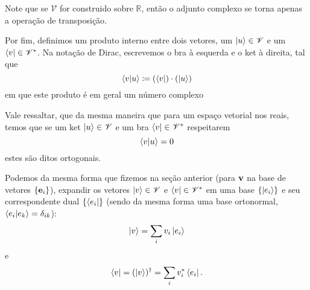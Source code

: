 Note que se $\mathscr{V}$ for construido sobre $\mathbb{R}$, então o adjunto complexo se torna apenas a operação de transposição. 

Por fim, definimos um produto interno entre dois vetores, um $\ket{u}\in\mathscr{V}$ e um  $\bra{v}\in\mathscr{V}^{\ast}$. Na notação de Dirac, escrevemos o bra à esquerda e o ket à direita, tal que
    \begin{equation}
    \label{inner product in Dirac notation}
        \braket{v}{u} \coloneqq (\bra{v})\cdot(\ket{u})
    \end{equation}
em que este produto é em geral um número complexo

Vale ressaltar, que da mesma maneira que para um espaço vetorial nos reais, temos que se um ket $\ket{u}\in\mathscr{V}$ e um bra $\bra{v}\in\mathscr{V}^{\ast}$ respeitarem
    \begin{equation*}
        \braket{v}{u} = 0
    \end{equation*}
estes são ditos ortogonais.

Podemos da mesma forma que fizemos na seção anterior (para $\vb{v}$ na base de vetores $\{\vb{e}_i\}$), expandir os vetores $\ket{v}\in\mathscr{V}$ e $\bra{v}\in\mathscr{V}^{\ast}$ em uma base $\{\ket{e_i}\}$ e seu correspondente dual $\{\bra{e_{i}}\}$ (sendo da mesma forma uma base ortonormal, $\braket{e_i}{e_k} = \delta_{ik}$):
    \begin{equation}
    \label{ket expansion in ortonormal basis}
        \ket{v} = \sum_{i} v_{i} \ket{e_i} 
    \end{equation}
e
    \begin{equation}
        \label{bra expansion in ortonormal basis}
        \bra{v} = (\ket{v})^\dagger = \sum_{i} v_{i}^{\ast}\bra{e_{i}}.
    \end{equation}
    
    
